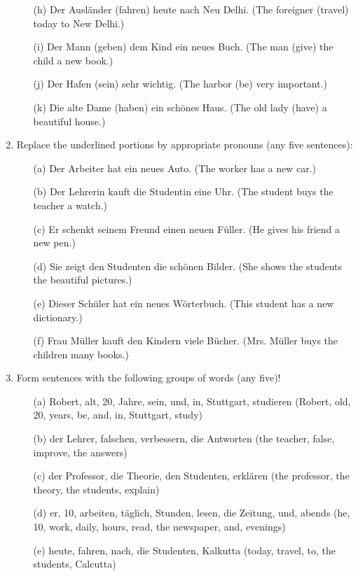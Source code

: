 \documentclass{article}
\begin{document}
\begin{enumerate}
\begin{enumerate}
        \item[(h)] Der Ausländer (fahren) heute nach Neu Delhi. (The foreigner (travel) today to New Delhi.)
        \item[(i)] Der Mann (geben) dem Kind ein neues Buch. (The man (give) the child a new book.)
        \item[(j)] Der Hafen (sein) sehr wichtig. (The harbor (be) very important.)
        \item[(k)] Die alte Dame (haben) ein schönes Haus. (The old lady (have) a beautiful house.)
    \end{enumerate}
    \item Replace the underlined portions by appropriate pronouns (any five sentences):
    \begin{enumerate}
        \item[(a)] Der Arbeiter hat ein neues Auto. (The worker has a new car.)
        \item[(b)] Der Lehrerin kauft die Studentin eine Uhr. (The student buys the teacher a watch.)
        \item[(c)] Er schenkt seinem Freund einen neuen Füller. (He gives his friend a new pen.)
        \item[(d)] Sie zeigt den Studenten die schönen Bilder. (She shows the students the beautiful pictures.)
        \item[(e)] Dieser Schüler hat ein neues Wörterbuch. (This student has a new dictionary.)
        \item[(f)] Frau Müller kauft den Kindern viele Bücher. (Mrs. Müller buys the children many books.)
    \end{enumerate}
    \item Form sentences with the following groups of words (any five)!
    \begin{enumerate}
        \item[(a)] Robert, alt, 20, Jahre, sein, und, in, Stuttgart, studieren (Robert, old, 20, years, be, and, in, Stuttgart, study)
        \item[(b)] der Lehrer, falschen, verbessern, die Antworten (the teacher, false, improve, the answers)
        \item[(c)] der Professor, die Theorie, den Studenten, erklären (the professor, the theory, the students, explain)
        \item[(d)] er, 10, arbeiten, täglich, Stunden, lesen, die Zeitung, und, abends (he, 10, work, daily, hours, read, the newspaper, and, evenings)
        \item[(e)] heute, fahren, nach, die Studenten, Kalkutta (today, travel, to, the students, Calcutta)

\end{enumerate}
\end{enumerate}
\end{document}
